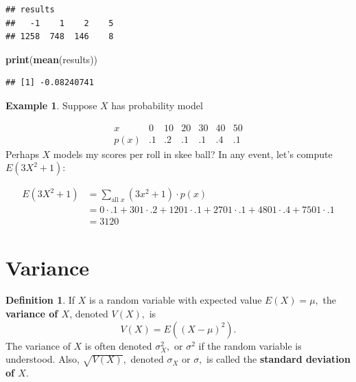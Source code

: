 \documentclass[
]{book}
\newenvironment{Shaded}{\begin{snugshade}}{\end{snugshade}}
\newcommand{\FunctionTok}[1]{\textcolor[rgb]{0.13,0.29,0.53}{\textbf{#1}}}
\newcommand{\NormalTok}[1]{#1}
\theoremstyle{definition}
\newtheorem{definition}{Definition}[chapter]
\theoremstyle{definition}
\newtheorem{example}{Example}[chapter]
\theoremstyle{definition}
\theoremstyle{definition}
\theoremstyle{remark}
\begin{document}
\begin{verbatim}
## results
##   -1    1    2    5 
## 1258  748  146    8
\end{verbatim}

\begin{Shaded}
\begin{Highlighting}[]
\FunctionTok{print}\NormalTok{(}\FunctionTok{mean}\NormalTok{(results))}
\end{Highlighting}
\end{Shaded}

\begin{verbatim}
## [1] -0.08240741
\end{verbatim}

\begin{example}
Suppose \(X\) has probability model

\[
\begin{array}{c|c|c|c|c|c|c}
x & 0 & 10 & 20 & 30 & 40 & 50\\ \hline
p(x) & .1 & .2 & .1 & .1 & .4 & .1  
\end{array}
\]
Perhaps \(X\) models my scores per roll in skee ball? In any event, let's compute \(E(3X^2 + 1)\):

\begin{align*}
E(3X^2 + 1) &= \sum_{\text{all }x} (3x^2 + 1)\cdot p(x)\\
&= 0 \cdot .1 + 301\cdot .2 + 1201\cdot .1 + 2701 \cdot .1 + 4801 \cdot .4 + 7501 \cdot .1\\
&= 3120
\end{align*}
\end{example}

\section{Variance}\label{variance}

\begin{definition}
\protect\hypertarget{def:variance-discrete}{}\label{def:variance-discrete}If \(X\) is a random variable with expected value \(E(X) = \mu,\) the \textbf{variance of \(X\)}, denoted \(V(X),\) is \[V(X) = E((X-\mu)^2).\]
The variance of \(X\) is often denoted \(\sigma^2_X,\) or \(\sigma^2\) if the random variable is understood. Also, \(\sqrt{V(X)},\) denoted \(\sigma_X\) or \(\sigma,\) is called the \textbf{standard deviation of \(X\)}.
\end{definition}
\end{document}

